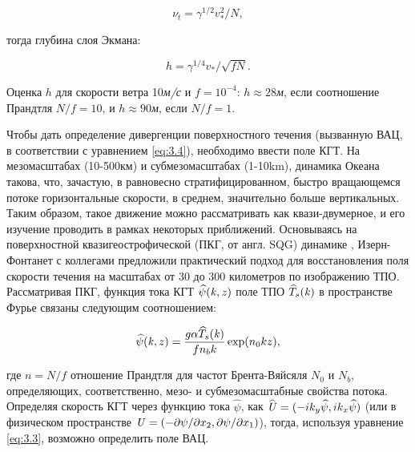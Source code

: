 \begin{equation} \label{eq:3.6} \nu _{t} =\gamma ^{1/2} v_{*}^{2} /N,  \end{equation}



\noindent тогда глубина слоя Экмана:



\begin{equation} \label{eq:3.7} h=\gamma ^{1/4} v_{*} /\sqrt{fN} .  \end{equation} 



Оценка $h$ для скорости ветра 10\textit{м/с} и $f=10^{-4} $: $h\approx 28$\textit{м}, если соотношение Прандтля $N/f=10$, и $h\approx 90$\textit{м}, если $N/f=1$.

Чтобы дать определение дивергенции поверхностного течения (вызванную ВАЦ, в соответствии с уравнением \eqref{eq:3.4}), необходимо ввести поле КГТ. На мезомасштабах (10-500км) и субмезомасштабах (1-10km), динамика Океана такова, что, зачастую, в равновесно стратифицированном, быстро вращающемся потоке горизонтальные скорости, в среднем, значительно больше вертикальных. Таким образом, такое движение можно рассматривать как квази-двумерное, и его изучение проводить в рамках некоторых приближений. Основываясь на поверхностной квазигеострофической (ПКГ, от англ. SQG) динамике \citep{Held1995,Lapeyre2006}, Изерн-Фонтанет с коллегами \citep{Isern-Fontanet2008} предложили практический подход для восстановления поля скорости течения на масштабах от 30 до 300 километров по изображению ТПО. Рассматривая ПКГ, функция тока КГТ $\widehat{\psi }({\it k},z)$ поле ТПО $\widehat{T}_{s} ({\it k})$ в пространстве Фурье связаны следующим соотношением:



\begin{equation} \label{eq:3.8} \widehat{\psi }({\it k},z)=\frac{g\alpha \widehat{T}_{s} ({\it k})}{fn_{b} k} \exp (n_{0} kz),  \end{equation} 



\noindent где $n=N/f$ отношение Прандтля для частот Брента-Вяйсяля $N_{0} $ и $N_{b} $, определяющих, соответственно, мезо- и субмезомасштабные свойства потока. Определяя скорость КГТ через функцию тока $\widehat{\psi }$, как $\widehat{{\it U}}=(-ik_{y} \widehat{\psi },ik_{x} \widehat{\psi })$ (или в физическом пространстве ${\it U}=(-\partial \psi /\partial x_{2} ,\partial \psi /\partial x_{1} )$), тогда, используя уравнение \eqref{eq:3.3}, возможно определить поле ВАЦ. 

